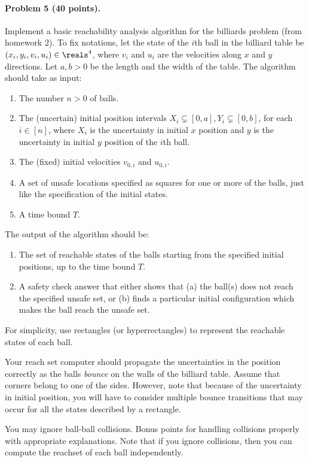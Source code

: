 \documentclass[11pt]{article}
\begin{document}
\paragraph{Problem 5 (40 points).}
Implement a basic reachability analysis algorithm for the billiards problem (from homework 2). To fix notations,  let the state of the $i$th ball in the billiard table be  $(x_i, y_i, v_i, u_i) \in \reals^4$, where $v_i$ and $u_i$   are the velocities along $x$ and $y$ directions. Let $a, b > 0$ be the length and the width of the table.  The algorithm should  take as input:
\begin{enumerate}
\item The number $n > 0$ of balls.
\item The (uncertain) initial position intervals $X_i \subsetneq [0,a], Y_i \subsetneq [0,b]$, for each $i \in [n]$, where $X_i$ is the uncertainty in initial $x$ position and $y$ is the uncertainty in initial $y$ position of the $i$th ball.
\item The (fixed) initial velocities $v_{0,i}$ and $u_{0,i}$.
\item A set of unsafe locations specified as squares for one or more of the balls, just like the specification of the initial states.
\item A time bound $T$.
\end{enumerate}
The output of the algorithm should be:
\begin{enumerate}
	\item The set of reachable states of the balls starting from the specified initial positions, up to the time bound $T$.
	\item A safety check answer that either shows that (a) the ball(s) does not reach the specified unsafe set, or (b) finds a particular initial configuration which makes the ball reach the unsafe set.
\end{enumerate}
For simplicity, use rectangles (or hyperrectangles) to represent the reachable states of each ball.
%

Your reach set computer should propagate the uncertainties in the position correctly as the balls {\em bounce\/} on the walls of the billiard table. Assume that corners belong to one of the sides. However, note that because of the uncertainty in initial position, you will have to consider multiple bounce transitions that may occur for all the states described by a rectangle.

You may ignore ball-ball collisions. Bonus points for handling collisions properly with appropriate explanations. Note that if you ignore collisions, then you can compute the reachset of each ball independently.
\end{document}
